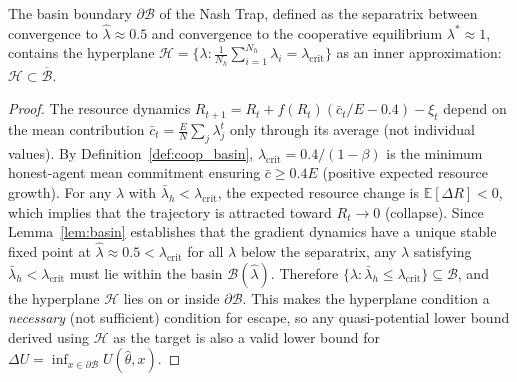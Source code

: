 \begin{lemma}
\label{lem:hyperplane}
The basin boundary $\partial \mathcal{B}$ of the Nash Trap, defined as the separatrix between convergence to $\hat{\lambda} \approx 0.5$ and convergence to the cooperative equilibrium $\lambda^* \approx 1$, contains the hyperplane $\mathcal{H} = \{\lambda : \frac{1}{N_h}\sum_{i=1}^{N_h} \lambda_i = \lambda_{\mathrm{crit}}\}$ as an inner approximation: $\mathcal{H} \subset \overline{\mathcal{B}}$.
\end{lemma}
\begin{proof}
The resource dynamics $R_{t+1} = R_t + f(R_t)(\bar{c}_t/E - 0.4) - \xi_t$ depend on the mean contribution $\bar{c}_t = \frac{E}{N}\sum_j \lambda_j^t$ only through its average (not individual values). By Definition~\ref{def:coop_basin}, $\lambda_{\mathrm{crit}} = 0.4/(1-\beta)$ is the minimum honest-agent mean commitment ensuring $\bar{c} \geq 0.4E$ (positive expected resource growth). For any $\lambda$ with $\bar{\lambda}_h < \lambda_{\mathrm{crit}}$, the expected resource change is $\mathbb{E}[\Delta R] < 0$, which implies that the trajectory is attracted toward $R_t \to 0$ (collapse). Since Lemma~\ref{lem:basin} establishes that the gradient dynamics have a unique stable fixed point at $\hat{\lambda} \approx 0.5 < \lambda_{\mathrm{crit}}$ for all $\lambda$ below the separatrix, any $\lambda$ satisfying $\bar{\lambda}_h < \lambda_{\mathrm{crit}}$ must lie within the basin $\mathcal{B}(\hat{\lambda})$. Therefore $\{{\lambda : \bar{\lambda}_h \leq \lambda_{\mathrm{crit}}}\} \subseteq \mathcal{B}$, and the hyperplane $\mathcal{H}$ lies on or inside $\partial \mathcal{B}$. This makes the hyperplane condition a \emph{necessary} (not sufficient) condition for escape, so any quasi-potential lower bound derived using $\mathcal{H}$ as the target is also a valid lower bound for $\Delta U = \inf_{x \in \partial \mathcal{B}} U(\hat{\theta}, x)$.
\end{proof}

